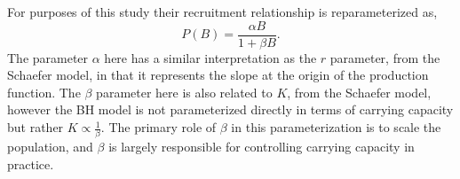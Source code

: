 %
For purposes of this study their recruitment relationship is 
reparameterized as, %
%
\begin{equation}
P(B) = \frac{\alpha B}{1+\beta B}.
\end{equation}
%
The parameter $\alpha$ here has a similar interpretation as the $r$ parameter, 
from the Schaefer model, in that it represents the slope at the origin of the 
production function. The $\beta$ parameter here is also related to $K$, 
from the Schaefer model, however the BH model is not parameterized 
directly in terms of carrying capacity but rather $K\propto\frac{1}{\beta}$. 
The primary role of $\beta$ in this parameterization is to scale the 
population, and $\beta$ is largely responsible for controlling carrying capacity 
in practice. 


